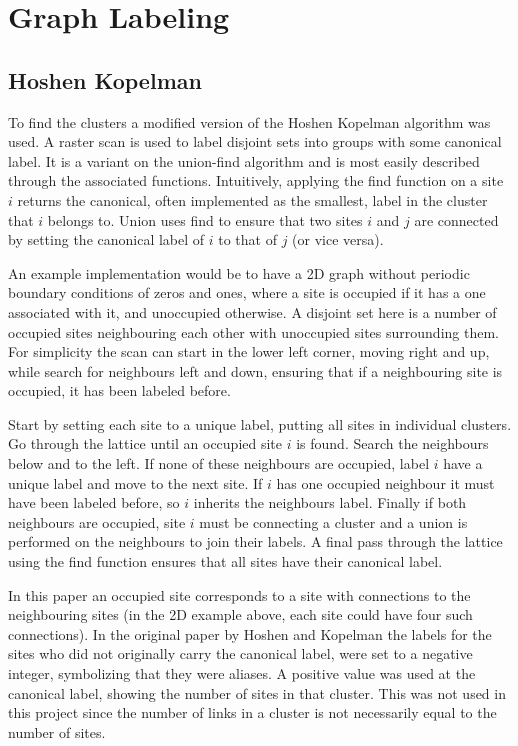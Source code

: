 
\section{Graph Labeling}
\label{sec:GraphLabeling}

\subsection{Hoshen Kopelman}
\label{subsec:HoshenKopelman}

To find the clusters a modified version of the Hoshen Kopelman algorithm was used. A raster scan is used to label disjoint sets into groups with some canonical label\cite{Hoshen:HKAlgo}. It is a variant on the union-find algorithm and is most easily described through the associated functions. Intuitively, applying the find function on a site $i$ returns the canonical, often implemented as the smallest, label in the cluster that $i$ belongs to. Union uses find to ensure that two sites $i$ and $j$ are connected by setting the canonical label of $i$ to that of $j$ (or vice versa). 

An example implementation would be to have a 2D graph without periodic boundary conditions of zeros and ones, where a site is occupied if it has a one associated with it, and unoccupied otherwise. A disjoint set here is a number of occupied sites neighbouring each other with unoccupied sites surrounding them. For simplicity the scan can start in the lower left corner, moving right and up, while search for neighbours left and down, ensuring that if a neighbouring site is occupied, it has been labeled before. 

Start by setting each site to a unique label, putting all sites in individual clusters. Go through the lattice until an occupied site $i$ is found. Search the neighbours below and to the left. If none of these neighbours are occupied, label $i$ have a unique label and move to the next site. If $i$ has one occupied neighbour it must have been labeled before, so $i$ inherits the neighbours label. Finally if both neighbours are occupied, site $i$ must be connecting a cluster and a union is performed on the neighbours to join their labels. A final pass through the lattice using the find function ensures that all sites have their canonical label.

In this paper an occupied site corresponds to a site with connections to the neighbouring sites (in the 2D example above, each site could have four such connections). In the original paper by Hoshen and Kopelman the labels for the sites who did not originally carry the canonical label, were set to a negative integer, symbolizing that they were aliases. A positive value was used at the canonical label, showing the number of sites in that cluster. This was not used in this project since the number of links in a cluster is not necessarily equal to the number of sites.

